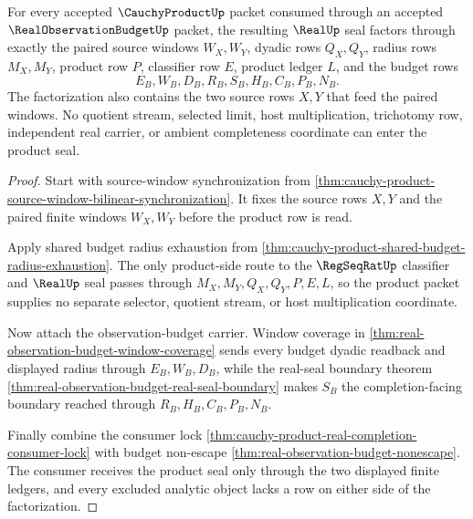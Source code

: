 \begin{theorem}
\label{thm:cauchy-product-finite-window-real-seal-factorization}
For every accepted $\CauchyProductUp$ packet consumed through an accepted $\RealObservationBudgetUp$ packet, the resulting $\RealUp$ seal factors through exactly the paired source windows $W_X,W_Y$, dyadic rows $Q_X,Q_Y$, radius rows $M_X,M_Y$, product row $P$, classifier row $E$, product ledger $L$, and the budget rows
$$
E_B,W_B,D_B,R_B,S_B,H_B,C_B,P_B,N_B.
$$
The factorization also contains the two source rows $X,Y$ that feed the paired windows. No quotient stream, selected limit, host multiplication, trichotomy row, independent real carrier, or ambient completeness coordinate can enter the product seal.
\end{theorem}
\begin{proof}
Start with source-window synchronization from \autoref{thm:cauchy-product-source-window-bilinear-synchronization}. It fixes the source rows $X,Y$ and the paired finite windows $W_X,W_Y$ before the product row is read.

Apply shared budget radius exhaustion from \autoref{thm:cauchy-product-shared-budget-radius-exhaustion}. The only product-side route to the $\RegSeqRatUp$ classifier and $\RealUp$ seal passes through $M_X,M_Y,Q_X,Q_Y,P,E,L$, so the product packet supplies no separate selector, quotient stream, or host multiplication coordinate.

Now attach the observation-budget carrier. Window coverage in \autoref{thm:real-observation-budget-window-coverage} sends every budget dyadic readback and displayed radius through $E_B,W_B,D_B$, while the real-seal boundary theorem \autoref{thm:real-observation-budget-real-seal-boundary} makes $S_B$ the completion-facing boundary reached through $R_B,H_B,C_B,P_B,N_B$.

Finally combine the consumer lock \autoref{thm:cauchy-product-real-completion-consumer-lock} with budget non-escape \autoref{thm:real-observation-budget-nonescape}. The consumer receives the product seal only through the two displayed finite ledgers, and every excluded analytic object lacks a row on either side of the factorization.
\end{proof}

